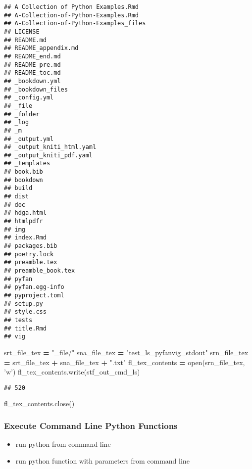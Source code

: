 \documentclass[
]{book}
\newenvironment{Shaded}{\begin{snugshade}}{\end{snugshade}}
\newcommand{\BuiltInTok}[1]{#1}
\newcommand{\NormalTok}[1]{#1}
\newcommand{\OperatorTok}[1]{\textcolor[rgb]{0.81,0.36,0.00}{\textbf{#1}}}
\newcommand{\StringTok}[1]{\textcolor[rgb]{0.31,0.60,0.02}{#1}}
\providecommand{\tightlist}{%
  \setlength{\itemsep}{0pt}\setlength{\parskip}{0pt}}
\begin{document}
\begin{verbatim}
## A Collection of Python Examples.Rmd
## A-Collection-of-Python-Examples.Rmd
## A-Collection-of-Python-Examples_files
## LICENSE
## README.md
## README_appendix.md
## README_end.md
## README_pre.md
## README_toc.md
## _bookdown.yml
## _bookdown_files
## _config.yml
## _file
## _folder
## _log
## _m
## _output.yml
## _output_kniti_html.yaml
## _output_kniti_pdf.yaml
## _templates
## book.bib
## bookdown
## build
## dist
## doc
## hdga.html
## htmlpdfr
## img
## index.Rmd
## packages.bib
## poetry.lock
## preamble.tex
## preamble_book.tex
## pyfan
## pyfan.egg-info
## pyproject.toml
## setup.py
## style.css
## tests
## title.Rmd
## vig
\end{verbatim}

\begin{Shaded}
\begin{Highlighting}[]
\NormalTok{srt_file_tex }\OperatorTok{=} \StringTok{"_file/"}
\NormalTok{sna_file_tex }\OperatorTok{=} \StringTok{"test_ls_pyfanvig_stdout"}
\NormalTok{srn_file_tex }\OperatorTok{=}\NormalTok{ srt_file_tex }\OperatorTok{+}\NormalTok{ sna_file_tex }\OperatorTok{+} \StringTok{".txt"}
\NormalTok{fl_tex_contents }\OperatorTok{=} \BuiltInTok{open}\NormalTok{(srn_file_tex, }\StringTok{'w'}\NormalTok{)}
\NormalTok{fl_tex_contents.write(stf_out_cmd_ls)}
\end{Highlighting}
\end{Shaded}

\begin{verbatim}
## 520
\end{verbatim}

\begin{Shaded}
\begin{Highlighting}[]
\NormalTok{fl_tex_contents.close()}
\end{Highlighting}
\end{Shaded}

\hypertarget{execute-command-line-python-functions}{%
\subsubsection{Execute Command Line Python Functions}\label{execute-command-line-python-functions}}

\begin{itemize}
\tightlist
\item
  run python from command line
\item
  run python function with parameters from command line
\end{itemize}
\end{document}
